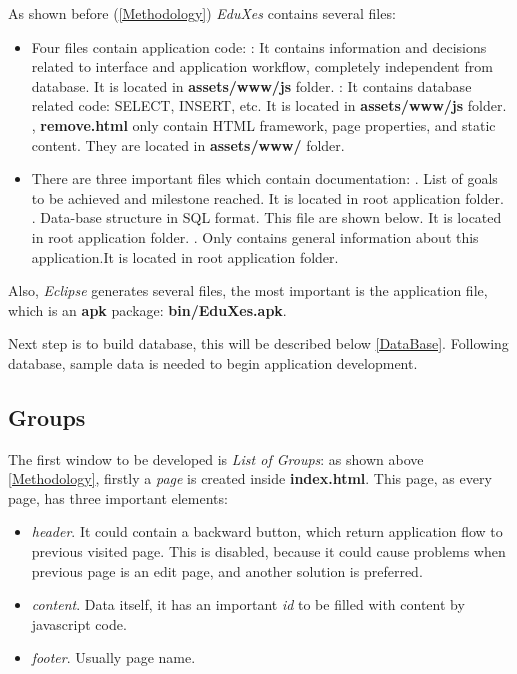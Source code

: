 % 
% 
% 
% 
As shown before (\ref{Methodology}) \emph{EduXes} contains several files:
\begin{itemize}
\item Four files contain application code:
 : It contains information and decisions related to interface and application workflow, completely independent from database. It is located in {\bf assets/www/js} folder.
 : It contains database related code: SELECT, INSERT, etc. It is located in {\bf assets/www/js} folder.
, {\bf remove.html} only contain HTML framework, page properties, and static content.  They are located in {\bf assets/www/} folder.
\item There are three important files which contain documentation:
. List of goals to be achieved and milestone reached. It is located in root application folder.
.  Data-base structure in SQL format. This file are shown below. It is located in root application folder.
. Only contains general information about this application.It is located in root application folder.
\end{itemize}

Also, \emph{Eclipse} generates several files, the most important is the application file, which is an {\bf apk } package: {\bf bin/EduXes.apk}.

Next step is to build database, this will be described below \ref{DataBase}. 
Following database, sample data is needed to begin application development. 

\newpage

\subsection{Groups}

The first window to be developed is \emph{List of Groups}: as shown above \ref{Methodology}, firstly a \emph{page} is created inside {\bf index.html}. This page, as every page,  has three important elements:
\begin{itemize}
    \item  \emph{header}. It could contain a backward button, which return application flow to previous visited page. This is disabled,
because it could cause problems when previous page is an edit page, and another solution is preferred.    
    \item \emph{content}. Data itself, it has an important \emph{id} to be filled with content by javascript code.
    \item \emph{footer}. Usually page name.
\end{itemize}

